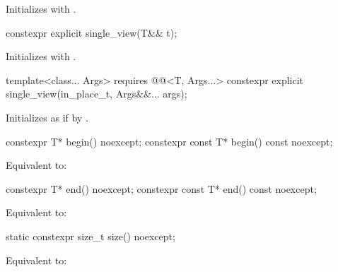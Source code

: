 \begin{itemdescr}
\pnum
\effects
Initializes  with .
\end{itemdescr}

%
\begin{itemdecl}
constexpr explicit single_view(T&& t);
\end{itemdecl}

\begin{itemdescr}
\pnum
\effects
Initializes  with .
\end{itemdescr}

%
\begin{itemdecl}
template<class... Args>
  requires @@<T, Args...>
constexpr explicit single_view(in_place_t, Args&&... args);
\end{itemdecl}

\begin{itemdescr}
\pnum
\effects
Initializes  as if by
.
\end{itemdescr}

%
\begin{itemdecl}
constexpr T* begin() noexcept;
constexpr const T* begin() const noexcept;
\end{itemdecl}

\begin{itemdescr}
\pnum
\effects
Equivalent to: 
\end{itemdescr}

%
\begin{itemdecl}
constexpr T* end() noexcept;
constexpr const T* end() const noexcept;
\end{itemdecl}

\begin{itemdescr}
\pnum
\effects
Equivalent to: 
\end{itemdescr}

%
\begin{itemdecl}
static constexpr size_t size() noexcept;
\end{itemdecl}

\begin{itemdescr}
\pnum
\effects
Equivalent to: 
\end{itemdescr}

